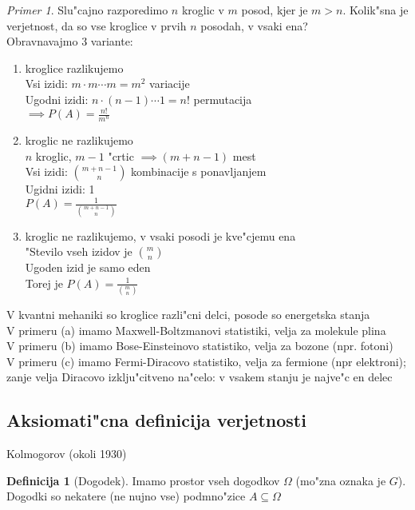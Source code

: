 \documentclass[a4paper,12pt]{article}
\theoremstyle{definition}
\newtheorem{defn}[counter]{Definicija}
\theoremstyle{remark}
\newtheorem*{ex}{Primer}
\begin{document}
\begin{ex}
    Slu"cajno razporedimo $n$ kroglic v $m$ posod, kjer je $m>n$. Kolik"sna je verjetnost, da so vse kroglice v prvih
    $n$ posodah, v vsaki ena? \\
    Obravnavajmo 3 variante:
    \begin{enumerate}
        \item kroglice razlikujemo \\
            Vsi izidi: $m \cdot m \cdots m = m^2$ variacije \\
            Ugodni izidi: $n \cdot (n-1) \cdots 1 = n!$ permutacija \\
            $\implies P(A) = \frac{n!}{m^n}$
        \item kroglic ne razlikujemo \\
            $n$ kroglic, $m-1$ "crtic $\implies (m+n-1)$ mest \\
            Vsi izidi: $\binom{m+n-1}{n}$ kombinacije s ponavljanjem \\
            Ugidni izidi: 1 \\
            $P(A) = \frac{1}{\binom{m+n-1}{n}}$
        \item kroglic ne razlikujemo, v vsaki posodi je kve"cjemu ena \\
            "Stevilo vseh izidov je $\binom{m}{n}$ \\
            Ugoden izid je samo eden \\
            Torej je $P(A) = \frac{1}{\binom{m}{n}}$
    \end{enumerate}
\end{ex}

V kvantni mehaniki so kroglice razli"cni delci, posode so energetska stanja \\
V primeru (a) imamo Maxwell-Boltzmanovi statistiki, velja za molekule plina \\
V primeru (b) imamo Bose-Einsteinovo statistiko, velja za bozone (npr. fotoni) \\
V primeru (c) imamo Fermi-Diracovo statistiko, velja za fermione (npr elektroni);
zanje velja Diracovo izklju"citveno na"celo: v vsakem stanju je najve"c en delec

\subsection{Aksiomati"cna definicija verjetnosti}

Kolmogorov (okoli 1930)

\begin{defn}[Dogodek]
    Imamo prostor vseh dogodkov $\Omega$ (mo"zna oznaka je $G$). Dogodki so nekatere (ne nujno vse)
    podmno"zice $A \subseteq \Omega$
\end{defn}
\end{document}
